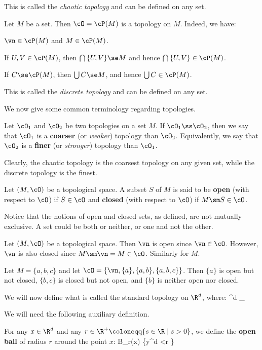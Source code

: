 This is called the \emph{chaotic topology} and can be defined on any set.
\ee

\be
Let $M$ be a set. Then $\cO=\cP(M)$ is a topology on $M$. Indeed, we have:
\ben
\item[i)] $\vn \in \cP(M)$ and $M \in \cP(M)$.
\item[ii)] If $U,V \in \cP(M)$, then $\bigcap\, \{U,V\} \se M$ and hence $\bigcap\, \{U,V\} \in \cP(M)$.
\item[iii)] If $C\se\cP(M)$, then $\bigcup C \se M$, and hence $\bigcup C\in \cP(M)$.
\een

This is called the \emph{discrete topology} and can be defined on any set.
\ee

We now give some common terminology regarding topologies.

Let $\cO_1$ and $\cO_2$ be two topologies on a set $M$. If $\cO_1 \ss \cO_2$, then we say that $\cO_1$ is a
\textbf{coarser} (or \emph{weaker}) topology than $\cO_2$. Equivalently, we say that $\cO_2$ is a \textbf{finer} (or
\emph{stronger}) topology than $\cO_1$.
\ed

Clearly, the chaotic topology is the coarsest topology on any given set, while the discrete topology is the finest.

Let $(M,\cO)$ be a topological space. A subset $S$ of $M$ is said to be \textbf{open} (with respect to $\cO$) if $S
\in \cO$ and \textbf{closed} (with respect to $\cO$) if $M\sm S \in \cO$.
\ed

Notice that the notions of open and closed sets, as defined, are not mutually exclusive. A set could be both or
neither, or one and not the other.

\be
Let $(M,\cO)$ be a topological space. Then $\vn$ is open since $\vn \in \cO$. However, $\vn$ is also closed since
$M\sm \vn = M \in \cO$. Similarly for $M$.
\ee

\be
Let $M = \{a,b,c\}$ and let $\cO=\{\vn,\{a\},\{a,b\},\{a,b,c\}\}$. Then $\{a\}$ is open but not closed, $\{b,c\}$ is
closed but not open, and $\{b\}$ is neither open nor closed.
\ee

We will now define what is called the standard topology on $\R^d$, where:
\bse
\R^d \coloneqq \underbrace{\R\times\R\times\cdots\times\R}_
\ese

We will need the following auxiliary definition.

For any $x\in\R^d$ and any $r \in \R^+ \coloneqq \{s\in\R\mid s>0\}$, we define the \textbf{open ball} of radius $r$
around the point $x$:
\bse
B_r(x) \coloneqq \bigl\{y\in \R^d \mid \textstyle{} <r \bigr\}
\ese

